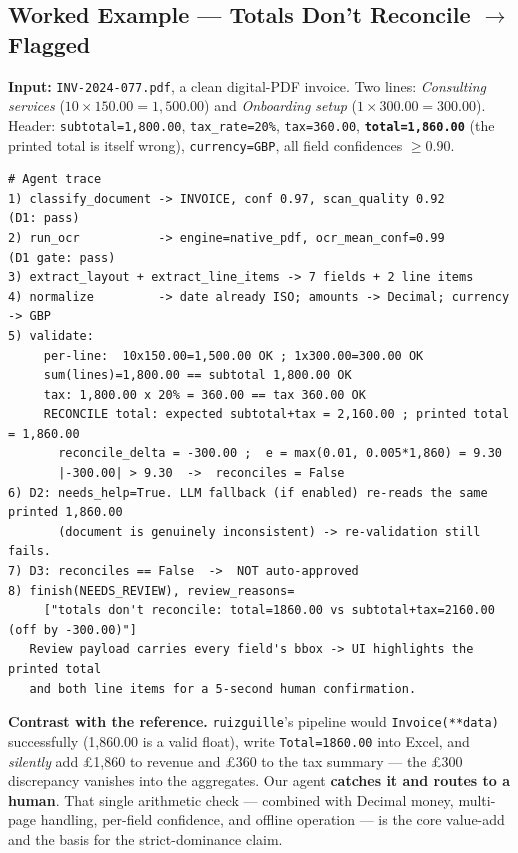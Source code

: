 \documentclass[12pt,a4paper]{article}
\begin{document}
\subsection{Worked Example --- Totals Don't Reconcile $\to$ Flagged}

\textbf{Input:} \texttt{INV-2024-077.pdf}, a clean digital-PDF invoice. Two lines:
\emph{Consulting services} ($10\times150.00=1{,}500.00$) and \emph{Onboarding setup}
($1\times300.00=300.00$). Header: \texttt{subtotal=1,800.00}, \texttt{tax\_rate=20\%},
\texttt{tax=360.00}, \textbf{\texttt{total=1,860.00}} (the printed total is itself wrong),
\texttt{currency=GBP}, all field confidences $\geq 0.90$.

\begin{lstlisting}[basicstyle=\ttfamily\footnotesize]
# Agent trace
1) classify_document -> INVOICE, conf 0.97, scan_quality 0.92         (D1: pass)
2) run_ocr           -> engine=native_pdf, ocr_mean_conf=0.99         (D1 gate: pass)
3) extract_layout + extract_line_items -> 7 fields + 2 line items
4) normalize         -> date already ISO; amounts -> Decimal; currency -> GBP
5) validate:
     per-line:  10x150.00=1,500.00 OK ; 1x300.00=300.00 OK
     sum(lines)=1,800.00 == subtotal 1,800.00 OK
     tax: 1,800.00 x 20% = 360.00 == tax 360.00 OK
     RECONCILE total: expected subtotal+tax = 2,160.00 ; printed total = 1,860.00
       reconcile_delta = -300.00 ;  e = max(0.01, 0.005*1,860) = 9.30
       |-300.00| > 9.30  ->  reconciles = False
6) D2: needs_help=True. LLM fallback (if enabled) re-reads the same printed 1,860.00
       (document is genuinely inconsistent) -> re-validation still fails.
7) D3: reconciles == False  ->  NOT auto-approved
8) finish(NEEDS_REVIEW), review_reasons=
     ["totals don't reconcile: total=1860.00 vs subtotal+tax=2160.00 (off by -300.00)"]
   Review payload carries every field's bbox -> UI highlights the printed total
   and both line items for a 5-second human confirmation.
\end{lstlisting}

\textbf{Contrast with the reference.} \texttt{ruizguille}'s pipeline would
\texttt{Invoice(**data)} successfully (1,860.00 is a valid float), write
\texttt{Total=1860.00} into Excel, and \emph{silently} add \pounds1,860 to revenue and
\pounds360 to the tax summary --- the \pounds300 discrepancy vanishes into the
aggregates. Our agent \textbf{catches it and routes to a human}. That single arithmetic
check --- combined with Decimal money, multi-page handling, per-field confidence, and
offline operation --- is the core value-add and the basis for the strict-dominance
claim.
\end{document}
